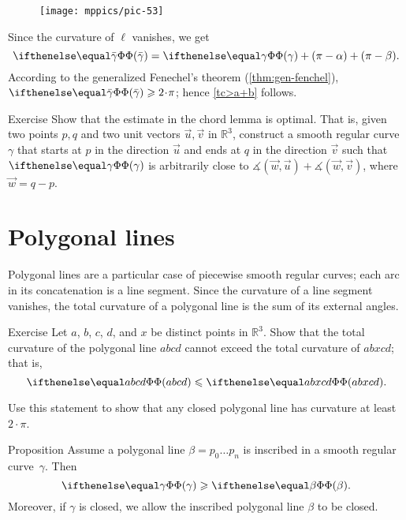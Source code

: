 \begin{wrapfigure}{r}{45 mm}
\vskip-5mm
\centering
\texttt{[image: mppics/pic-53]}
\vskip0mm
\end{wrapfigure}

Since the curvature of $\ell$ vanishes, we get 
\[\tc{\bar\gamma}=\tc\gamma+(\pi-\alpha)+(\pi-\beta).\]
According to the generalized Fenechel's theorem (\ref{thm:gen-fenchel}),
$\tc{\bar\gamma}\ge 2\cdot\pi$;
hence \ref{tc>a+b} follows.
\qeds

\begin{thm}{Exercise}\label{ex:chord-lemma-optimal}
Show that the estimate in the chord lemma is optimal.
That is, given two points $p, q$ and two unit vectors $\vec u,\vec v$ in $\mathbb{R}^3$,
construct a smooth regular curve $\gamma$ that starts at $p$ in the direction $\vec u$ and ends at $q$ in the direction $\vec v$ such that 
$\tc\gamma$ is arbitrarily close to $\measuredangle(\vec w,\vec u)+\measuredangle(\vec w,\vec v)$, where $\vec w=q-p$.

\end{thm}

\section{Polygonal lines} 

Polygonal lines are a particular case of piecewise smooth regular curves;
each arc in its concatenation is a line segment.
Since the curvature of a line segment vanishes, the total curvature of a polygonal line is the sum of its external angles.

\begin{thm}{Exercise}\label{ex:monotonic-tc}
Let $a$, $b$, $c$, $d$, and $x$ be distinct points in $\mathbb{R}^3$.
Show that the total curvature of the polygonal line $abcd$ cannot exceed the total curvature of $abxcd$; that is, 
\[\tc {abcd} \le \tc {abxcd}.\]

Use this statement to show that any closed polygonal line has curvature at least $2\cdot\pi$.
\end{thm}



\begin{thm}{Proposition}\label{prop:inscribed-total-curvature}
Assume a polygonal line $\beta=p_0\dots p_n$ is inscribed in a smooth regular curve~$\gamma$.
Then 
\[\tc\gamma\ge \tc{\beta}.\]
Moreover, if $\gamma$ is closed, we allow the inscribed polygonal line $\beta$ to be closed.

\end{thm}

